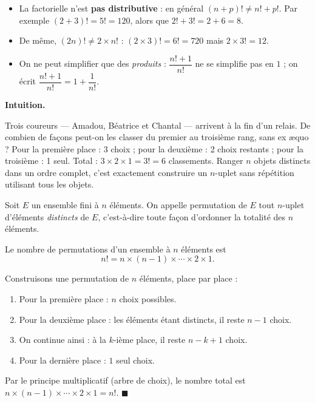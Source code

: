 \documentclass[11pt]{article}
\newcommand{\cle}[1]{{\popxbold\color{popdark}#1}}
\newcounter{popsec}
\newcounter{popsub}
\newcommand{\courssub}[1]{%
  \stepcounter{popsub}%
  \par\vspace{9pt}\noindent{\popxbold\fontsize{11.5}{13}\selectfont\color{popink}{\color{poporange}\thepopsec.\thepopsub}\hspace{6pt}#1}\par\nopagebreak\vspace{4pt}
}
\begin{document}
\begin{attention}
\begin{itemize}
\item La factorielle n'est \textbf{pas distributive} : en général $(n+p)! \neq n! + p!$. Par exemple $(2+3)! = 5! = 120$, alors que $2! + 3! = 2 + 6 = 8$.
\item De même, $(2n)! \neq 2\times n!$ : $(2\times 3)! = 6! = 720$ mais $2\times 3! = 12$.
\item On ne peut simplifier que des \emph{produits} : $\dfrac{n!+1}{n!}$ ne se simplifie pas en $1$ ; on écrit $\dfrac{n!+1}{n!} = 1 + \dfrac{1}{n!}$.
\end{itemize}
\end{attention}

\courssub{Permutations de $n$ éléments}

\textbf{Intuition.}\par Trois coureurs — Amadou, Béatrice et Chantal — arrivent à la fin d'un relais. De combien de façons peut-on les classer du premier au troisième rang, sans ex æquo ? Pour la première place : 3 choix ; pour la deuxième : 2 choix restants ; pour la troisième : 1 seul. Total : $3\times 2\times 1 = 3! = 6$ classements. Ranger $n$ objets distincts dans un ordre complet, c'est exactement construire un $n$-uplet sans répétition utilisant tous les objets.

\begin{definition}[Permutation]
Soit $E$ un ensemble fini à $n$ éléments. On appelle \cle{permutation} de $E$ tout $n$-uplet d'éléments \emph{distincts} de $E$, c'est-à-dire toute façon d'ordonner la totalité des $n$ éléments.
\end{definition}

\begin{propriete}
Le nombre de permutations d'un ensemble à $n$ éléments est
\[ n! = n\times (n-1)\times \cdots \times 2\times 1. \]
\end{propriete}

\begin{experience}
Construisons une permutation de $n$ éléments, place par place :
\begin{enumerate}
\item Pour la première place : $n$ choix possibles.
\item Pour la deuxième place : les éléments étant distincts, il reste $n-1$ choix.
\item On continue ainsi : à la $k$-ième place, il reste $n-k+1$ choix.
\item Pour la dernière place : $1$ seul choix.
\end{enumerate}
Par le principe multiplicatif (arbre de choix), le nombre total est $n\times(n-1)\times\cdots\times 2\times 1 = n!$. \hfill$\blacksquare$
\end{experience}
\end{document}
